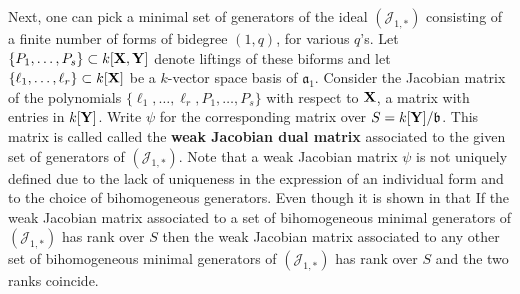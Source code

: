 \documentclass[11pt]{amsart}
\numberwithin{equation}{theorem}
\def\XX{{\bf X}}
\def\YY{{\bf Y}}
\renewcommand{\:}{\colon}
\theoremstyle{theorem}
\begin{document}
Next, one can pick a minimal set of generators of the ideal $({\mathcal J}_{1,*})$ consisting of a finite number
of forms of bidegree $(1,q)$, for various $q$'s.
Let $\{P_1,\ldots,P_s\}\subset k[\XX,\YY]$ denote liftings of these biforms and let $\{\ell_1,\ldots,\ell_r\}\subset k[\XX]$ be  a $k$-vector space
basis of ${\mathfrak a}_1$.
Consider the Jacobian matrix of the polynomials $\{\ell_1,\ldots,\ell_r, P_1,\ldots,P_s\}$ with respect to $\XX$, a matrix with entries in $k[\YY]$.
Write $\psi$ for the corresponding matrix over $S=k[\YY]/{\mathfrak b}$. This matrix is called  called the {\bf weak Jacobian dual matrix}  associated to
the given set of generators of $({\mathcal J}_{1,*})$.
Note that a weak Jacobian matrix $\psi$ is not uniquely defined due to the lack of uniqueness in the expression of
an individual form and to the choice of bihomogeneous generators. Even though it is shown in \cite[Lemma 2.13]{DoriaHassanzadehSimisBirationality} that  If the weak Jacobian matrix associated  to a set of bihomogeneous minimal generators of
$({\mathcal J}_{1,*})$ has rank over $S$ then the weak Jacobian matrix associated to any other
set of bihomogeneous minimal generators of
$({\mathcal J}_{1,*})$ has  rank over $S$ and the two ranks coincide.
\end{document}
